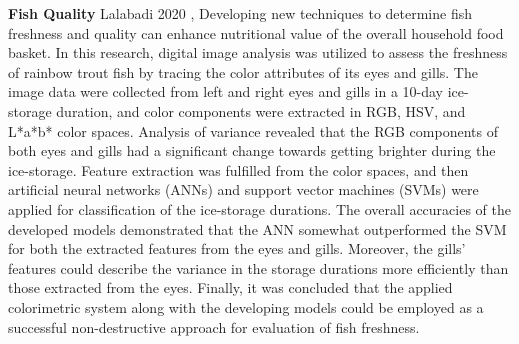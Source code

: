 \textbf{Fish Quality}\newline
Lalabadi 2020 \cite{Lalabadi2020FishFC},
Developing new techniques to determine fish freshness and quality can enhance nutritional value of the overall household food basket. In this research, digital image analysis was utilized to assess the freshness of rainbow trout fish by tracing the color attributes of its eyes and gills. The image data were collected from left and right eyes and gills in a 10-day ice-storage duration, and color components were extracted in RGB, HSV, and L*a*b* color spaces. Analysis of variance revealed that the RGB components of both eyes and gills had a significant change towards getting brighter during the ice-storage. Feature extraction was fulfilled from the color spaces, and then artificial neural networks (ANNs) and support vector machines (SVMs) were applied for classification of the ice-storage durations. The overall accuracies of the developed models demonstrated that the ANN somewhat outperformed the SVM for both the extracted features from the eyes and gills. Moreover, the gills’ features could describe the variance in the storage durations more efficiently than those extracted from the eyes. Finally, it was concluded that the applied colorimetric system along with the developing models could be employed as a successful non-destructive approach for evaluation of fish freshness.

